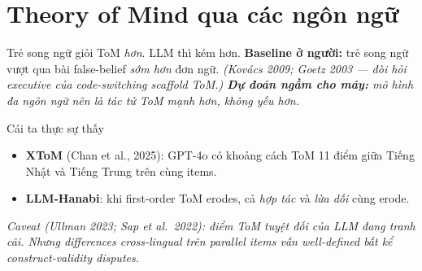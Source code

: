 \documentclass[11pt,aspectratio=169]{beamer}
\begin{document}
\section{Theory of Mind qua các ngôn ngữ}

\begin{frame}{Trẻ song ngữ giỏi ToM \emph{hơn}. LLM thì kém hơn.}
    \large
    \textbf{Baseline ở người:} trẻ song ngữ vượt qua bài false-belief \emph{sớm hơn} đơn ngữ.
    \scriptsize \itshape (Kovács 2009; Goetz 2003 --- đòi hỏi executive của code-switching scaffold ToM.)
    \vspace{0.3cm}
    \normalsize\textbf{Dự đoán ngầm cho máy:} mô hình đa ngôn ngữ nên là tác tử ToM \emph{mạnh hơn}, không yếu hơn.
    \vspace{0.4cm}
    \begin{block}{Cái ta thực sự thấy}
        \begin{itemize}
            \setlength\itemsep{0.3em}
            \item \textbf{XToM} (Chan et al., 2025): GPT-4o có khoảng cách ToM 11 điểm giữa Tiếng Nhật và Tiếng Trung trên cùng items.
            \item \textbf{LLM-Hanabi}: khi first-order ToM erodes, cả \emph{hợp tác} và \emph{lừa dối} cùng erode.
        \end{itemize}
    \end{block}
    \vspace{0.2cm}
    \footnotesize\itshape Caveat (Ullman 2023; Sap et al.\ 2022): điểm ToM tuyệt đối của LLM đang tranh cãi. Nhưng \emph{differences} cross-lingual trên parallel items vẫn well-defined bất kể construct-validity disputes.
\end{frame}
\end{document}
